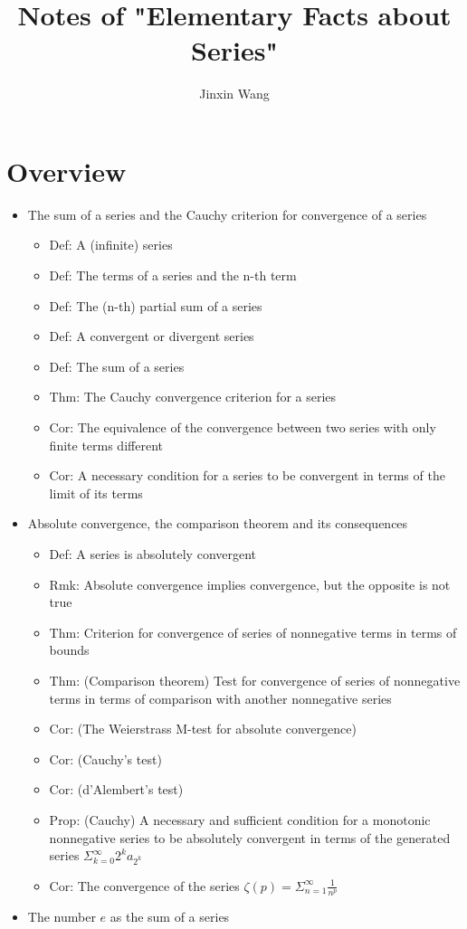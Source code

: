 \documentclass[onecolumn]{ctexart}
\title{Notes of "Elementary Facts about Series"}
\author{Jinxin Wang}
\date{}
\begin{document}
\maketitle

\section{Overview}
\begin{itemize}
  \item The sum of a series and the Cauchy criterion for convergence of a series
  \begin{itemize}
    \item Def: A (infinite) series
    \item Def: The terms of a series and the n-th term
    \item Def: The (n-th) partial sum of a series
    \item Def: A convergent or divergent series
    \item Def: The sum of a series
    \item Thm: The Cauchy convergence criterion for a series
    \item Cor: The equivalence of the convergence between two series with only finite terms different
    \item Cor: A necessary condition for a series to be convergent in terms of the limit of its terms
  \end{itemize}
  \item Absolute convergence, the comparison theorem and its consequences
  \begin{itemize}
    \item Def: A series is absolutely convergent
    \item Rmk: Absolute convergence implies convergence, but the opposite is not true
    \item Thm: Criterion for convergence of series of nonnegative terms in terms of bounds
    \item Thm: (Comparison theorem) Test for convergence of series of nonnegative terms in terms of comparison with another nonnegative series
    \item Cor: (The Weierstrass M-test for absolute convergence)
    \item Cor: (Cauchy's test)
    \item Cor: (d'Alembert's test)
    \item Prop: (Cauchy) A necessary and sufficient condition for a monotonic nonnegative series to be absolutely convergent in terms of the generated series $\Sigma_{k=0}^{\infty}2^ka_{2^k}$
    \item Cor: The convergence of the series $\zeta(p) = \Sigma_{n=1}^{\infty} \frac{1}{n^p}$
  \end{itemize}
  \item The number $e$ as the sum of a series
\end{itemize}
\end{document}
